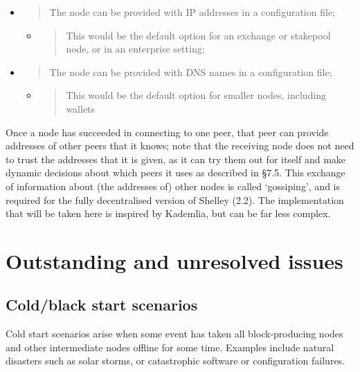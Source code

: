\documentclass[11pt,a4paper]{article}
\begin{document}
\begin{itemize}
\item
  \begin{quote}
  The node can be provided with IP addresses in a configuration file;
  \end{quote}

  \begin{itemize}
  \item
    \begin{quote}
    This would be the default option for an exchange or stakepool node,
    or in an enterprise setting;
    \end{quote}
  \end{itemize}
\item
  \begin{quote}
  The node can be provided with DNS names in a configuration file;
  \end{quote}

  \begin{itemize}
  \item
    \begin{quote}
    This would be the default option for smaller nodes, including
    wallets
    \end{quote}
  \end{itemize}
\end{itemize}

Once a node has succeeded in connecting to one peer, that peer can
provide addresses of other peers that it knows; note that the receiving
node does not need to trust the addresses that it is given, as it can
try them out for itself and make dynamic decisions about which peers it
uses as described in §7.5. This exchange of information about (the
addresses of) other nodes is called `gossiping', and is required for the
fully decentralised version of Shelley (2.2). The implementation that
will be taken here is inspired by Kademlia, but can be far less complex.

\section{Outstanding and unresolved issues}
\label{outstanding-unresolved-issues}

\subsection{Cold/black start scenarios}
\label{coldblack-start-scenarios}

Cold start scenarios arise when some event has taken all block-producing
nodes and other intermediate nodes offline for some time. Examples
include natural disasters such as solar storms, or catastrophic software
or configuration failures.
\end{document}
